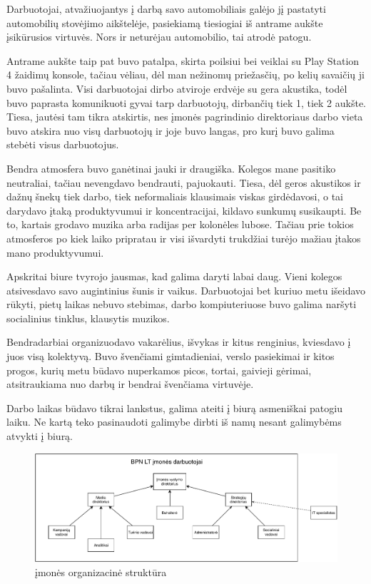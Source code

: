 \documentclass{VUMIFPSkursinis}
\begin{document}
Darbuotojai, atvažiuojantys į darbą savo automobiliais galėjo jį pastatyti automobilių stovėjimo aikštelėje, pasiekiamą tiesiogiai iš antrame aukšte įsikūrusios virtuvės. Nors ir neturėjau automobilio, tai atrodė patogu.

Antrame aukšte taip pat buvo patalpa, skirta poilsiui bei veiklai su Play Station 4 žaidimų konsole, tačiau vėliau, dėl man nežinomų priežasčių, po kelių savaičių ji buvo pašalinta. Visi darbuotojai dirbo atviroje erdvėje su gera akustika, todėl buvo paprasta komunikuoti gyvai tarp darbuotojų, dirbančių tiek 1, tiek 2 aukšte. Tiesa, jautėsi tam tikra atskirtis, nes įmonės pagrindinio direktoriaus darbo vieta buvo atskira nuo visų darbuotojų ir joje buvo langas, pro kurį buvo galima stebėti visus darbuotojus.

Bendra atmosfera buvo ganėtinai jauki ir draugiška. Kolegos mane pasitiko neutraliai, tačiau nevengdavo bendrauti, pajuokauti. Tiesa, dėl geros akustikos ir dažnų šnekų tiek darbo, tiek neformaliais klausimais viskas girdėdavosi, o tai darydavo įtaką produktyvumui ir koncentracijai, kildavo sunkumų susikaupti. Be to, kartais grodavo muzika arba radijas per kolonėles lubose. Tačiau prie tokios atmosferos po kiek laiko pripratau ir visi išvardyti trukdžiai turėjo mažiau įtakos mano produktyvumui.

Apskritai biure tvyrojo jausmas, kad galima daryti labai daug. Vieni kolegos atsivesdavo savo augintinius šunis ir vaikus. Darbuotojai bet kuriuo metu išeidavo rūkyti, pietų laikas nebuvo stebimas, darbo kompiuteriuose buvo galima naršyti socialinius tinklus, klausytis muzikos.

Bendradarbiai organizuodavo vakarėlius, išvykas ir kitus renginius, kviesdavo į juos visą kolektyvą. Buvo švenčiami gimtadieniai, verslo pasiekimai ir kitos progos, kurių metu būdavo nuperkamos picos, tortai, gaivieji gėrimai, atsitraukiama nuo darbų ir bendrai švenčiama virtuvėje.

Darbo laikas būdavo tikrai lankstus, galima ateiti į biurą asmeniškai patogiu laiku. Ne kartą teko pasinaudoti galimybe dirbti iš namų nesant galimybėms atvykti į biurą.

\begin{figure}[H]
    \centering
    \includegraphics[scale=0.7]{img/organisational.pdf}
    \caption{įmonės organizacinė struktūra}
    \label{img:model}
\end{figure}
\end{document}
